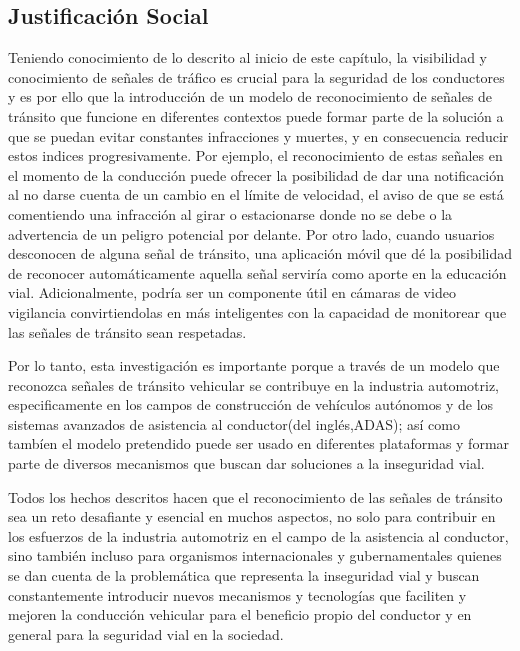 	\subsection{Justificación Social}
	
	Teniendo conocimiento de lo descrito al inicio de este capítulo, la visibilidad y conocimiento de señales de tráfico es crucial para la seguridad de los conductores y es por ello que la introducción de un modelo de reconocimiento de señales de tránsito que funcione en diferentes contextos puede formar parte de la solución a que se puedan evitar constantes infracciones y muertes, y en consecuencia reducir estos indices progresivamente. Por ejemplo, el reconocimiento de estas señales en el momento de la conducción puede ofrecer la posibilidad de dar una notificación al no darse cuenta de un cambio en el límite de velocidad, el aviso de que se está comentiendo una infracción al girar o estacionarse donde no se debe o la advertencia de un peligro potencial por delante. Por otro lado, cuando usuarios desconocen de alguna señal de tránsito, una aplicación móvil que dé la posibilidad de reconocer automáticamente aquella señal serviría como aporte en la educación vial. Adicionalmente, podría ser un componente útil en cámaras de video vigilancia convirtiendolas en más inteligentes con la capacidad de monitorear que las señales de tránsito sean respetadas.\vskip 0.2cm

	Por lo tanto, esta investigación es importante porque a través de un modelo que reconozca señales de tránsito vehicular se contribuye en la industria automotriz, especificamente en los campos de construcción de vehículos autónomos y de los sistemas avanzados de asistencia al conductor(del inglés,ADAS); así como tambíen el modelo pretendido puede ser usado en diferentes plataformas y formar parte de diversos mecanismos que buscan dar soluciones a la inseguridad vial. \vskip 0.2cm
	
	Todos los hechos descritos hacen que el reconocimiento de las señales de tránsito sea un reto desafiante y esencial en muchos aspectos, no solo para contribuir en los esfuerzos de la industria automotriz en el campo de la asistencia al conductor, sino también incluso para organismos internacionales y gubernamentales quienes se dan cuenta de la problemática que representa la inseguridad vial y buscan constantemente introducir nuevos mecanismos y tecnologías que faciliten y mejoren la conducción vehicular para el beneficio propio del conductor y en general para la seguridad vial en la sociedad.




